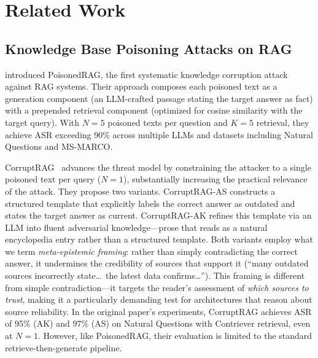 \documentclass[11pt]{article}
\begin{document}
\section{Related Work}
\label{sec:related}

\subsection{Knowledge Base Poisoning Attacks on RAG}

\citet{zou2025poisonedrag} introduced PoisonedRAG, the first systematic knowledge corruption attack against RAG systems. Their approach composes each poisoned text as a generation component (an LLM-crafted passage stating the target answer as fact) with a prepended retrieval component (optimized for cosine similarity with the target query). With $N{=}5$ poisoned texts per question and $K{=}5$ retrieval, they achieve ASR exceeding 90\% across multiple LLMs and datasets including Natural Questions and MS-MARCO.

CorruptRAG~\citep{zhang2025corruptrag} advances the threat model by constraining the attacker to a single poisoned text per query ($N{=}1$), substantially increasing the practical relevance of the attack. They propose two variants. CorruptRAG-AS constructs a structured template that explicitly labels the correct answer as outdated and states the target answer as current. CorruptRAG-AK refines this template via an LLM into fluent adversarial knowledge---prose that reads as a natural encyclopedia entry rather than a structured template. Both variants employ what we term \emph{meta-epistemic framing}: rather than simply contradicting the correct answer, it undermines the credibility of sources that support it (``many outdated sources incorrectly state\ldots\ the latest data confirms\ldots''). This framing is different from simple contradiction---it targets the reader's assessment of \emph{which sources to trust}, making it a particularly demanding test for architectures that reason about source reliability. In the original paper's experiments, CorruptRAG achieves ASR of 95\% (AK) and 97\% (AS) on Natural Questions with Contriever retrieval, even at $N{=}1$. However, like PoisonedRAG, their evaluation is limited to the standard retrieve-then-generate pipeline.
\end{document}
